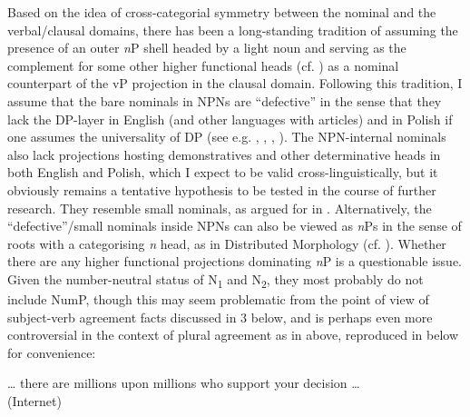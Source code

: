 \documentclass[output=paper]{langscibook}
\begin{document}
Based on the idea of cross-categorial symmetry between the nominal and the verbal/clausal domains, there has been a long-standing tradition of assuming the presence of an outer \textit{n}P shell headed by a light noun and serving as the complement for some other higher functional heads (cf. \citealt{Radford2000,Radford2009,Alexiadou.etal2007}) as a nominal counterpart of the vP projection in the clausal domain. Following this tradition, I assume that the bare nominals in NPNs are ``defective'' in the sense that they lack the DP-layer in English (and other languages with articles) and in Polish if one assumes the universality of DP (see e.g. \citealt{Progovac1998}, \citealt{Willim1998}, \citealt{Pereltsvaig2007}, \citealt{Jeong2016}). The NPN-internal nominals also lack projections hosting demonstratives and other determinative heads in both English and Polish, which I expect to be valid cross-linguistically, but it obviously remains a tentative hypothesis to be tested in the course of further research. They resemble  small nominals, as argued for in \citet{Pskit2017}. Alternatively, the ``defective''/small nominals inside NPNs can also be viewed as \textit{n}Ps in the sense of roots with a categorising \textit{n} head, as in Distributed Morphology (cf. \citealt{Halle.Marantz1993,harley1999distributed,Acquaviva2008}). Whether there are any higher functional projections dominating \textit{n}P is a questionable issue. Given the number-neutral status of N\textsubscript{1} and N\textsubscript{2}, they most probably do not include NumP, though this may seem problematic from the point of view of subject-verb agreement facts discussed in 3 below, and is perhaps even more controversial in the context of plural agreement as in  above, reproduced in  below for convenience:

\ea \label{psk:ex:key:16001}  … there are millions upon millions who support your decision   …\vspace{-12pt}\\ \null\hfill(Internet)\\
\z
\end{document}
